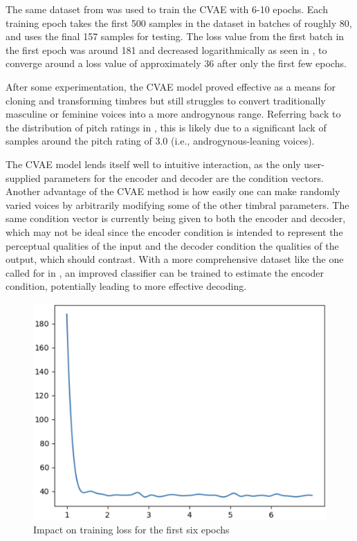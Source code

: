 \documentclass{article}
\begin{document}
The same dataset from \cite{doyle2025} was used to train the CVAE with 6-10 epochs. Each training epoch takes the first 500 samples in the dataset in batches of roughly 80, and uses the final 157 samples for testing. The loss value from the first batch in the first epoch was around 181 and decreased logarithmically as seen in , to converge around a loss value of approximately 36 after only the first few epochs.

After some experimentation, the CVAE model proved effective as a means for cloning and transforming timbres but still struggles to convert traditionally masculine or feminine voices into a more androgynous range. Referring back to the distribution of pitch ratings in , this is likely due to a significant lack of samples around the pitch rating of 3.0 (i.e., androgynous-leaning voices).

The CVAE model lends itself well to intuitive interaction, as the only user-supplied parameters for the encoder and decoder are the condition vectors. Another advantage of the CVAE method is how easily one can make randomly varied voices by arbitrarily modifying some of the other timbral parameters. The same condition vector is currently being given to both the encoder and decoder, which may not be ideal since the encoder condition is intended to represent the perceptual qualities of the input and the decoder condition the qualities of the output, which should contrast. With a more comprehensive dataset like the one called for in \cite{doyle2025}, an improved classifier can be trained to estimate the encoder condition, potentially leading to more effective decoding.

\begin{figure}
    \centering
    \includegraphics[width=0.9\linewidth]{training-loss.png}
    \caption{Impact on training loss for the first six epochs}
    \label{fig:training-loss}
\end{figure}
\end{document}
